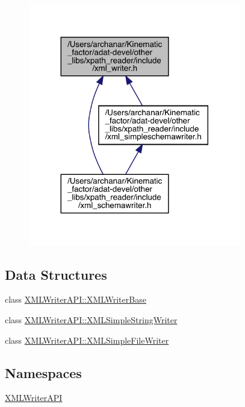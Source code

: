 \begin{figure}[H]
\begin{center}
\leavevmode
\includegraphics[width=263pt]{d5/daa/adat-devel_2other__libs_2xpath__reader_2include_2xml__writer_8h__dep__incl}
\end{center}
\end{figure}
\subsection*{Data Structures}
\begin{DoxyCompactItemize}
\item 
class \mbox{\hyperlink{classXMLWriterAPI_1_1XMLWriterBase}{X\+M\+L\+Writer\+A\+P\+I\+::\+X\+M\+L\+Writer\+Base}}
\item 
class \mbox{\hyperlink{classXMLWriterAPI_1_1XMLSimpleStringWriter}{X\+M\+L\+Writer\+A\+P\+I\+::\+X\+M\+L\+Simple\+String\+Writer}}
\item 
class \mbox{\hyperlink{classXMLWriterAPI_1_1XMLSimpleFileWriter}{X\+M\+L\+Writer\+A\+P\+I\+::\+X\+M\+L\+Simple\+File\+Writer}}
\end{DoxyCompactItemize}
\subsection*{Namespaces}
\begin{DoxyCompactItemize}
\item 
 \mbox{\hyperlink{namespaceXMLWriterAPI}{X\+M\+L\+Writer\+A\+PI}}
\end{DoxyCompactItemize}
